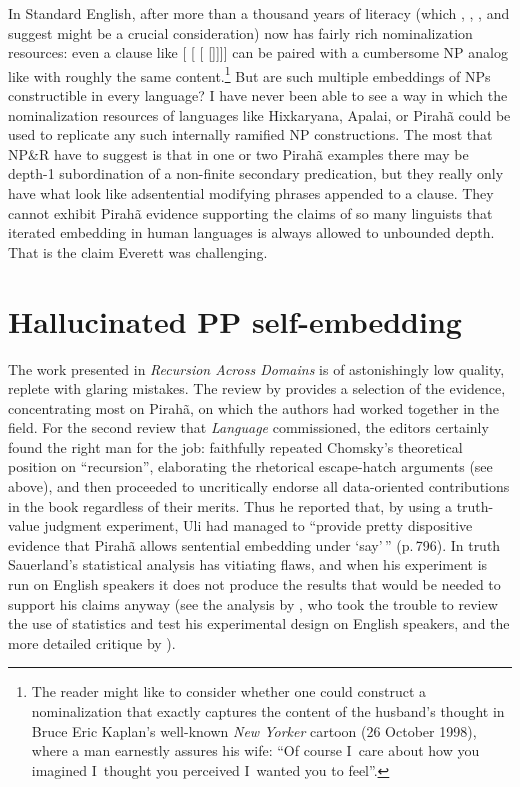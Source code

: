 \documentclass[output=paper,colorlinks,citecolor=brown
]{langscibook}
\begin{document}
In Standard English, after more than a thousand years of literacy
(which \citealt{ONeil77}, \citealt{Givon79}, \citealt{Mithun84}, and
\citealt{Kalmar85} suggest might be a crucial consideration) now has
fairly rich nominalization resources: even a clause like
 [ [
[ []]]] can be paired with
a cumbersome NP analog like  with roughly
the same content.\footnote{%
   The reader might like to consider whether one could construct a
   nominalization that exactly captures the content of the husband's
   thought in Bruce Eric Kaplan's well-known \textit{New Yorker}
   cartoon (26 October 1998), where a man earnestly assures his wife:
   ``Of course I~care about how you imagined I~thought you perceived
   I~wanted you to feel''.}
But are such multiple embeddings of NPs constructible in every language?
I have never been able to see a way in which the nominalization resources
of languages like Hixkaryana, Apalai, or Pirahã could be used to
replicate any such internally ramified NP constructions. The most that
NP\&R have to suggest is that in one or two Pirahã examples there
may be depth-1 subordination of a non-finite secondary predication, but
they really only have what look like adsentential modifying phrases
appended to a clause. They cannot exhibit Pirahã evidence supporting
the claims of so many linguists that iterated embedding in human
languages is always allowed to unbounded depth. That is the claim
Everett was challenging.

\section{Hallucinated PP self-embedding}\label{ppsection}

The work presented in \textit{Recursion Across Domains} \citep{AmMaNeRo18}
is of astonishingly low quality, replete with glaring mistakes. The review
by \citet{EverGibs19} provides a selection of the evidence, concentrating
most on Pirahã, on which the authors had worked together in the field.
For the second review that \textit{Language} commissioned, the editors
certainly found the right man for the job: \citet{Hornstein19} faithfully
repeated Chomsky's theoretical position on ``recursion'', elaborating
the rhetorical escape-hatch arguments (see  above),
and then proceeded to uncritically endorse all data-oriented contributions
in the book regardless of their merits. Thus he reported that, by using a
truth-value judgment experiment, Uli \citet{Sauerland18} had managed to
``provide pretty dispositive evidence that Pirahã allows sentential
embedding under `say'\,'' (p.\,796). In truth Sauerland's statistical
analysis has vitiating flaws, and when his experiment is run on English
speakers it does not produce the results that would be needed to
support his claims anyway (see the analysis by
\citealt[781--784]{EverGibs19}, who took the trouble to review the use
of statistics and test his experimental design on English speakers,
and the more detailed critique by ).
\end{document}
